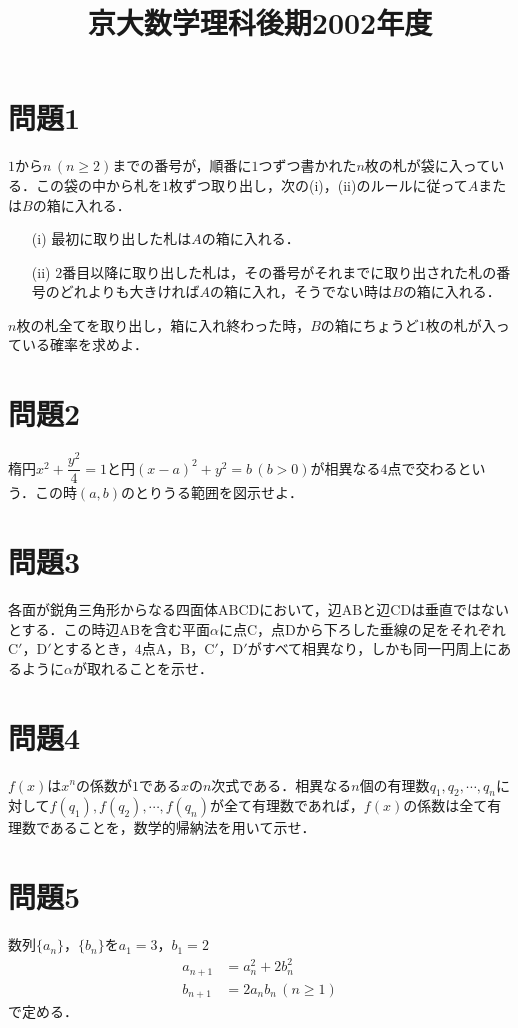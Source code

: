 \documentclass[unicode,12pt, A4j]{ltjsarticle}%
\title{京大数学理科後期2002年度}
\author{}
\date{}
\begin{document}
\maketitle

\section{問題1}
$1$から$n\, (n\ge 2)$までの番号が，順番に$1$つずつ書かれた$n$枚の札が袋に入っている．この袋の中から札を$1$枚ずつ取り出し，次の(i)，(ii)のルールに従って$A$または$B$の箱に入れる．
\begin{itemize}
 \item[(i)] 最初に取り出した札は$A$の箱に入れる．
 \item[(ii)] $2$番目以降に取り出した札は，その番号がそれまでに取り出された札の番号のどれよりも大きければ$A$の箱に入れ，そうでない時は$B$の箱に入れる．
\end{itemize}

$n$枚の札全てを取り出し，箱に入れ終わった時，$B$の箱にちょうど$1$枚の札が入っている確率を求めよ．

\section{問題2}
楕円$x^2+\dfrac{y^2}{4}=1$と円$(x-a)^2+y^2=b\, (b>0)$が相異なる$4$点で交わるという．この時$(a,b)$のとりうる範囲を図示せよ．


\section{問題3}
各面が鋭角三角形からなる四面体$\mathrm{ABCD}$において，辺$\mathrm{AB}$と辺$\mathrm{CD}$は垂直ではないとする．この時辺$\mathrm{AB}$を含む平面$\alpha$に点$\mathrm{C}$，点$\mathrm{D}$から下ろした垂線の足をそれぞれ$\mathrm{C}'$，$\mathrm{D}'$とするとき，$4$点$\mathrm{A}$，$\mathrm{B}$，$\mathrm{C}'$，$\mathrm{D}'$がすべて相異なり，しかも同一円周上にあるように$\alpha$が取れることを示せ．

\section{問題4}
$f(x)$は$x^n$の係数が$1$である$x$の$n$次式である．相異なる$n$個の有理数$q_1,q_2,\cdots ,q_n$に対して$f(q_1),f(q_2),\cdots,f(q_n)$が全て有理数であれば，$f(x)$の係数は全て有理数であることを，数学的帰納法を用いて示せ．

\section{問題5}
数列$\{a_n\}$，$\{b_n\}$を$a_1=3$，$b_1=2$
\begin{align*}
 a_{n+1}&=a_n^2+2b_n^2 \\
 b_{n+1}&=2a_nb_n\, (n\ge 1)
\end{align*}
で定める．
\end{document}
